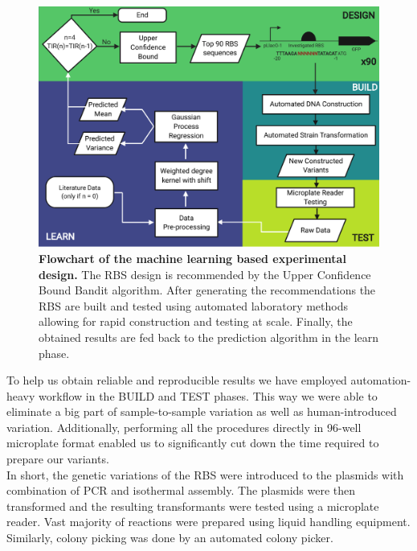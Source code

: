 \documentclass{article}
\begin{document}
\begin{figure}[h]
    \centering
    \includegraphics[scale=0.7]{plots/Main_Paper/flowchart.pdf}
    \caption{\textbf{Flowchart of the machine learning based experimental design.} The RBS design is recommended by the Upper Confidence Bound Bandit algorithm. After generating the recommendations the RBS are built and tested using automated laboratory methods allowing for rapid construction and testing at scale. Finally, the obtained results are fed back to the prediction algorithm in the learn phase. }
    \label{fig: Flowchart}
\end{figure}
To help us obtain reliable and reproducible results we have employed automation-heavy workflow in the BUILD and TEST phases.
This way we were able to eliminate a big part of sample-to-sample variation as well as human-introduced variation.
Additionally, performing all the procedures directly in 96-well microplate format enabled us to significantly cut down the time required to prepare our variants.\\

In short, the genetic variations of the RBS were introduced to the plasmids with combination of PCR and isothermal assembly. 
The plasmids were then transformed and the resulting transformants were tested using a  microplate reader.
Vast majority of reactions were prepared using liquid handling equipment.
Similarly, colony picking was done by an automated colony picker.\\

\end{document}
